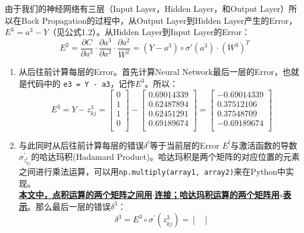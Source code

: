 \documentclass[a4paper,12pt,oneside]{book}
\begin{document}
由于我们的神经网络有三层（Input Layer，Hidden Layer，和Output Layer）所以在Back Propagation的过程中，从Output Layer到Hidden Layer产生的Error，$E^3=a^3-Y$（见公式1.2）。从Hidden Layer到Input Layer的Error：
\begin{equation}
    E^2=\frac{\partial{C}}{\partial{a^3}}\cdot\frac{\partial{a^3}}{\partial{a^2}}\cdot\frac{\partial{a^2}}{W^2}=(Y-a^3) \circ \sigma{'}(a^3) \cdot (W^3)^T
\end{equation}
\begin{enumerate}
    \item 从后往前计算每层的Error。首先计算Neural Network最后一层的Error，也就是代码中的 \lstinline{e3 = Y - a3}，记作$E^{3}$。所以：
    \begin{equation*}
        E^3 = Y - z^{3}_{kj}
        = \begin{bmatrix}
            0 \\
            1 \\
            1 \\
            0 \\
        \end{bmatrix}
        - \begin{bmatrix}
           0.69014339\\
           0.62487894\\
           0.62451291\\
           0.69189674\\
        \end{bmatrix}
        = \begin{bmatrix}
            -0.69014339\\
            0.37512106\\
            0.37548709\\
            -0.69189674\\
        \end{bmatrix}
    \end{equation*}
    \item 与此同时从后往前计算每层的错误$\delta^{l}$等于当前层的Error $E^{l}$与激活函数的导数$\sigma^{'}_{z^l_{kj}}$的哈达玛积(Hadamard Product)。哈达玛积是两个矩阵的对应位置的元素之间进行乘法运算，可以用\lstinline{np.multiply(array1, array2)}来在Python中实现。\\
    \underline{\textbf{本文中，点积运算的两个矩阵之间用$\cdot$连接；哈达玛积运算的两个矩阵用$\circ$表示}}。那么最后一层的错误$\delta^3$：
    \begin{equation*}
        \delta^3 = E^{3} \circ \sigma^{'}(z^3_{kj})
        = \begin{bmatrix}

\end{bmatrix}
\end{equation*}
\end{enumerate}
\end{document}
